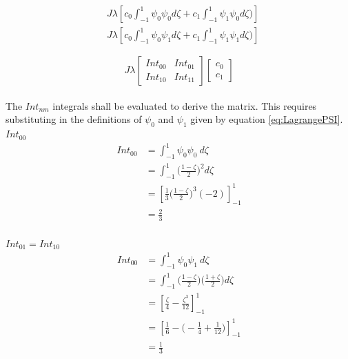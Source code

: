 \documentclass[11pt]{article}
\begin{document}
\begin{subequations}
\label{eq:reactsim}
\begin{align}
&J \lambda \left  [c_0 \int_{-1}^{1} \psi_{0} \psi_{0} d \zeta + c_1 \int_{-1}^{1} \psi_{1} \psi_{0} d\zeta ) \right ] \label{eq:reactrow1} \\
&J \lambda \left  [c_0 \int_{-1}^{1} \psi_{0} \psi_{1} d \zeta + c_1 \int_{-1}^{1} \psi_{1} \psi_{1} d\zeta ) \right ]  \label{eq:reactrow2} 
\end{align}
\end{subequations}



\begin{equation} \label{eq:reactunsolvedmatrix}
J \lambda
\begin{bmatrix}

Int_{00} & Int_{01} \\
Int_{10} & Int_{11}
\end{bmatrix}
\begin{bmatrix}

c_{0} \\  c_{1} 
\end{bmatrix}
\end{equation}
\\
The $Int_{nm}$ integrals shall be evaluated to derive the matrix. This requires substituting in the definitions of $\psi_0$ and $\psi_1$ given by equation \ref{eq:LagrangePSI}. \\

\underline{$Int_{00}$} \\
\begin{equation}\label{eq:Int00}
\begin{split}
 Int_{00} &= \int_{-1}^{1} \psi_{0}\psi_{0} \ d \zeta \\
&=  \int_{-1}^{1}  \Big ( \frac{1-\zeta}{2} \Big )^2 d\zeta \\
& = \left[ \frac{1}{3} \Big ( \frac{1-\zeta}{2} \Big )^3 (-2) \right]_{-1}^{1} \\
& = \frac{2}{3}
\end{split}
\end{equation} \\

\underline{$Int_{01} = Int_{10}$} \\

\begin{equation}\label{eq:Int01}
\begin{split}
 Int_{00} &= \int_{-1}^{1} \psi_{0}\psi_{1} \ d \zeta \\
&=  \int_{-1}^{1}  \Big ( \frac{1-\zeta}{2} \Big )  \Big ( \frac{1+\zeta}{2} \Big )d\zeta \\
& = \left[ \frac{\zeta}{4} - \frac{\zeta^3}{12}\right]_{-1}^{1} \\
& = \left[ \frac{1}{6} -  \Big (-\frac{1}{4} + \frac{1}{12} \Big )\right]_{-1}^{1} \\
& = \frac{1}{3}
\end{split}
\end{equation} \\
\end{document}
